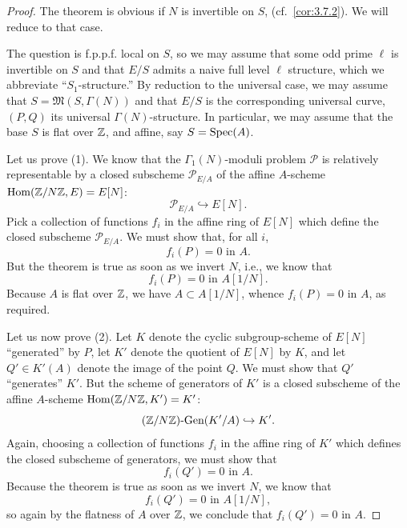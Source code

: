 \begin{proof}
The theorem is obvious if $N$ is invertible on $S$, (cf.\ \ref{cor:3.7.2}). We will reduce to that case.

The question is f.p.p.f. local on $S$, so we may assume that some odd prime $\ell$ is invertible on $S$ and that $E/S$ admits a naive full level $\ell$ structure, which we abbreviate ``$S_1$-structure.'' By reduction to the universal case, we may assume that $S = \mathfrak{M}(S, \Gamma(N))$ and that $E/S$ is the corresponding universal curve, $(P, Q)$ its universal $\Gamma(N)$-structure. In particular, we may assume that the base $S$ is flat over $\mathbb{Z}$, and affine, say $S = \operatorname{Spec}(A)$.

Let us prove (1). We know that the $\Gamma_1(N)$-moduli problem $\mathcal{P}$ is relatively representable by a closed subscheme $\mathcal{P}_{E/A}$ of the affine $A$-scheme $\operatorname{Hom}(\mathbb{Z}/N\mathbb{Z}, E) = E[N]$:
\[
\mathcal{P}_{E/A} \hookrightarrow E[N].
\]
Pick a collection of functions $f_i$ in the affine ring of $E[N]$ which define the closed subscheme $\mathcal{P}_{E/A}$. We must show that, for all $i$,
\[
f_i(P) = 0 \text{ in } A.
\]
But the theorem is true as soon as we invert $N$, i.e., we know that
\[
f_i(P) = 0 \text{ in } A[1/N].
\]
Because $A$ is flat over $\mathbb{Z}$, we have $A \subset A[1/N]$, whence $f_i(P) = 0$ in $A$, as required.

Let us now prove (2). Let $K$ denote the cyclic subgroup-scheme of $E[N]$ ``generated'' by $P$, let $K'$ denote the quotient of $E[N]$ by $K$, and let $Q' \in K'(A)$ denote the image of the point $Q$. We must show that $Q'$ ``generates'' $K'$. But the scheme of generators of $K'$ is a closed subscheme of the affine $A$-scheme $\operatorname{Hom}(\mathbb{Z}/N\mathbb{Z}, K') = K'$:
\[
(\mathbb{Z}/N\mathbb{Z})\text{-Gen}(K'/A) \hookrightarrow K'.
\]
Again, choosing a collection of functions $f_i$ in the affine ring of $K'$ which defines the closed subscheme of generators, we must show that
\[
f_i(Q') = 0 \text{ in } A.
\]
Because the theorem is true as soon as we invert $N$, we know that
\[
f_i(Q') = 0 \text{ in } A[1/N],
\]
so again by the flatness of $A$ over $\mathbb{Z}$, we conclude that $f_i(Q') = 0$ in $A$.
\end{proof}

